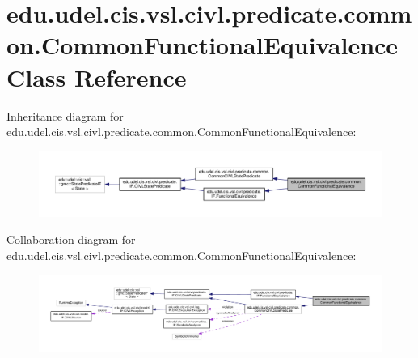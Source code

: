 \hypertarget{classedu_1_1udel_1_1cis_1_1vsl_1_1civl_1_1predicate_1_1common_1_1CommonFunctionalEquivalence}{}\section{edu.\+udel.\+cis.\+vsl.\+civl.\+predicate.\+common.\+Common\+Functional\+Equivalence Class Reference}
\label{classedu_1_1udel_1_1cis_1_1vsl_1_1civl_1_1predicate_1_1common_1_1CommonFunctionalEquivalence}


Inheritance diagram for edu.\+udel.\+cis.\+vsl.\+civl.\+predicate.\+common.\+Common\+Functional\+Equivalence\+:
\nopagebreak
\begin{figure}[H]
\begin{center}
\leavevmode
\includegraphics[width=350pt]{classedu_1_1udel_1_1cis_1_1vsl_1_1civl_1_1predicate_1_1common_1_1CommonFunctionalEquivalence__inherit__graph}
\end{center}
\end{figure}


Collaboration diagram for edu.\+udel.\+cis.\+vsl.\+civl.\+predicate.\+common.\+Common\+Functional\+Equivalence\+:
\nopagebreak
\begin{figure}[H]
\begin{center}
\leavevmode
\includegraphics[width=350pt]{classedu_1_1udel_1_1cis_1_1vsl_1_1civl_1_1predicate_1_1common_1_1CommonFunctionalEquivalence__coll__graph}
\end{center}
\end{figure}
